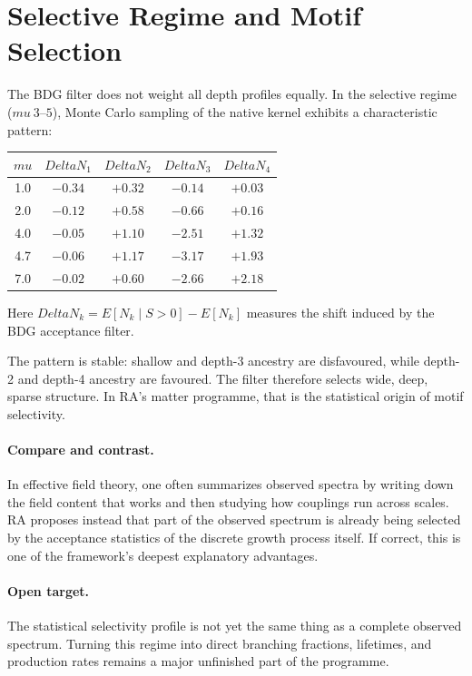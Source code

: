\documentclass[11pt]{article}
\def\Delta{Delta}%
\def\mu{mu}%
\def\mathbb#1{#1}%
\def\approx{~}%
\begin{document}
\section{Selective Regime and Motif Selection}

The BDG filter does not weight all depth profiles equally. In the selective regime ($\mu\approx 3$--$5$), Monte Carlo sampling of the native kernel exhibits a characteristic pattern:

\begin{center}
\begin{tabular}{ccccc}
\toprule
$\mu$ & $\Delta N_1$ & $\Delta N_2$ & $\Delta N_3$ & $\Delta N_4$ \\
\midrule
1.0 & $-0.34$ & $+0.32$ & $-0.14$ & $+0.03$ \\
2.0 & $-0.12$ & $+0.58$ & $-0.66$ & $+0.16$ \\
4.0 & $-0.05$ & $+1.10$ & $-2.51$ & $+1.32$ \\
4.7 & $-0.06$ & $+1.17$ & $-3.17$ & $+1.93$ \\
7.0 & $-0.02$ & $+0.60$ & $-2.66$ & $+2.18$ \\
\bottomrule
\end{tabular}
\end{center}

Here $\Delta N_k=\mathbb{E}[N_k\mid S>0]-\mathbb{E}[N_k]$ measures the shift induced by the BDG acceptance filter.

The pattern is stable: shallow and depth-3 ancestry are disfavoured, while depth-2 and depth-4 ancestry are favoured. The filter therefore selects wide, deep, sparse structure. In RA's matter programme, that is the statistical origin of motif selectivity.

\paragraph{Compare and contrast.} In effective field theory, one often summarizes observed spectra by writing down the field content that works and then studying how couplings run across scales. RA proposes instead that part of the observed spectrum is already being selected by the acceptance statistics of the discrete growth process itself. If correct, this is one of the framework's deepest explanatory advantages.

\paragraph{Open target.} The statistical selectivity profile is not yet the same thing as a complete observed spectrum. Turning this regime into direct branching fractions, lifetimes, and production rates remains a major unfinished part of the programme.
\end{document}
